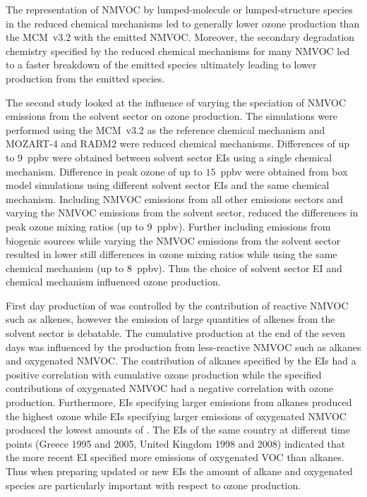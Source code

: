 The representation of NMVOC by lumped-molecule or lumped-structure species in the reduced chemical mechanisms led to generally lower ozone production than the MCM~v3.2 with the emitted NMVOC.
Moreover, the secondary degradation chemistry specified by the reduced chemical mechanisms for many NMVOC led to a faster breakdown of the emitted species ultimately leading to lower  production from the emitted species.

The second study looked at the influence of varying the speciation of NMVOC emissions from the solvent sector on ozone production.
The simulations were performed using the MCM~v3.2 as the reference chemical mechanism and MOZART-4 and RADM2 were reduced chemical mechanisms.
Differences of up to $9$~ppbv were obtained between solvent sector EIs using a single chemical mechanism.
Difference in peak ozone of up to $15$~ppbv were obtained from box model simulations using different solvent sector EIs and the same chemical mechanism.
Including NMVOC emissions from all other emissions sectors and varying the NMVOC emissions from the solvent sector, reduced the differences in peak ozone mixing ratios (up to $9$~ppbv).
Further including emissions from biogenic sources while varying the NMVOC emissions from the solvent sector resulted in lower still differences in ozone mixing ratios while using the same chemical mechanism (up to $8$~ppbv).
Thus the choice of solvent sector EI and chemical mechanism influenced ozone production.

First day production of  was controlled by the contribution of reactive NMVOC such as alkenes, however the emission of large quantities of alkenes from the solvent sector is debatable.
The cumulative  production at the end of the seven days was influenced by the  production from less-reactive NMVOC such as alkanes and oxygenated NMVOC.
The contribution of alkanes specified by the EIs had a positive correlation with cumulative ozone production while the specified contributions of oxygenated NMVOC had a negative correlation with ozone production.
Furthermore, EIs specifying larger emissions from alkanes produced the highest ozone while EIs specifying larger emissions of oxygenated NMVOC produced the lowest amounts of .
The EIs of the same country at different time points (Greece 1995 and 2005, United Kingdom 1998 and 2008) indicated that the more recent EI specified more emissions of oxygenated VOC than alkanes.
Thus when preparing updated or new EIs the amount of alkane and oxygenated species are particularly important with respect to ozone production.

